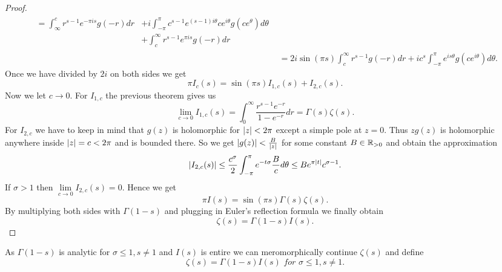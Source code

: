 \begin{proof}
\begin{equation*}
\begin{aligned}
\begin{aligned}
		= \int _\infty ^c r^{s - 1} e^{-\pi i s} g(-r) dr
		&+ i \int _{-\pi} ^{\pi} c^{s - 1} e^{(s - 1) i \theta} c e^{i \theta} g(c e^\theta) d\theta \\ 
		&+ \int _{c} ^\infty r^{s - 1} e^{\pi i s} g(-r) dr
	\end{aligned} \\
	&= 2 i \sin(\pi s) \int _c ^\infty r^{s - 1} g(-r) dr + i c^s \int _{-\pi} ^\pi e^{i s \theta} g(c e^{i \theta}) d\theta.
\end{aligned}
\end{equation*}
	Once we have divided by $2i$ on both sides we get
\begin{equation*}
	\pi I_c(s) = \sin(\pi s)I_{1, c}(s) + I_{2, c}(s).
\end{equation*}
	Now we let $c \to 0$. For $I_{1, c}$ the previous theorem gives us
\begin{equation*}
	\lim\limits _{c \to 0} I_{1, c}(s) = \int _0 ^\infty \frac{r^{s - 1} e^{-r}}{1 - e^{-r}} dr = \Gamma(s)\zeta(s).
\end{equation*}
	For $I_{2, c}$ we have to keep in mind that $g(z)$ is holomorphic for $\left|z\right| < 2 \pi$ except a simple pole at $z = 0$. Thus $z g(z)$ is holomorphic anywhere inside $\left|z\right| = c < 2 \pi$ and is bounded there. So we get $\left|g(z)\right| < \frac{B}{\left|z\right|}$ for some constant $B \in \mathbb{R}_{> 0}$ and obtain the approximation
\begin{equation*}
	\left|I_{2, c}(s)\right| \leq \frac{c^\sigma}{2} \int _{-\pi} ^{\pi} e^{-t \sigma} \frac{B}{c} d\theta \leq B e^{\pi \left|t\right|} c^{\sigma - 1}.
\end{equation*}
	If $\sigma > 1$ then $\lim\limits _{c \to 0} I_{2, c}(s) = 0$. Hence we get
\begin{equation*}
	\pi I(s) = \sin(\pi s) \Gamma(s)\zeta(s).
\end{equation*}
	By multiplying both sides with $\Gamma(1 - s)$ and plugging in Euler's reflection formula we finally obtain
\begin{equation*}
	\zeta(s) = \Gamma(1 - s) I(s).
\end{equation*}
\end{proof}


\begin{definition}
	As $\Gamma(1 - s)$ is analytic for $\sigma \leq 1, s \neq 1$ and $I(s)$ is entire we can meromorphically continue $\zeta(s)$ and define 
\begin{equation*}
	\zeta(s) = \Gamma(1 - s) I(s) \textit{ for } \sigma \leq 1, s \neq 1.
\end{equation*}
\end{definition}


